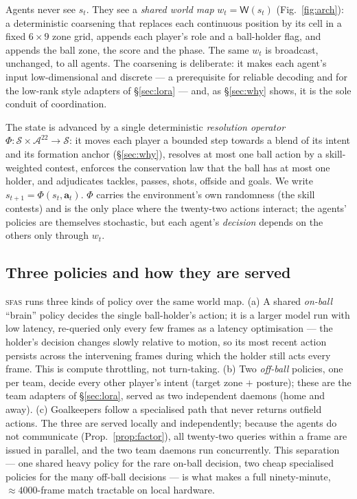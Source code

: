 \documentclass[11pt]{article}
\theoremstyle{definition}
\theoremstyle{remark}
\newcommand{\Sphere}{\mathcal{S}}
\newcommand{\Aspace}{\mathcal{A}}
\newcommand{\Wmap}{\mathsf{W}}
\newcommand{\sfas}{\textsc{sfas}}
\begin{document}
Agents never see $s_t$. They see a \emph{shared world map} $w_t=\Wmap(s_t)$ (Fig.~\ref{fig:arch}): a deterministic coarsening that replaces each continuous position by its cell in a fixed $6\times9$ zone grid, appends each player's role and a ball-holder flag, and appends the ball zone, the score and the phase. The same $w_t$ is broadcast, unchanged, to all agents. The coarsening is deliberate: it makes each agent's input low-dimensional and discrete --- a prerequisite for reliable decoding and for the low-rank style adapters of \S\ref{sec:lora} --- and, as \S\ref{sec:why} shows, it is the sole conduit of coordination.

The state is advanced by a single deterministic \emph{resolution operator} $\Phi:\Sphere\times\Aspace^{22}\to\Sphere$: it moves each player a bounded step towards a blend of its intent and its formation anchor (\S\ref{sec:why}), resolves at most one ball action by a skill-weighted contest, enforces the conservation law that the ball has at most one holder, and adjudicates tackles, passes, shots, offside and goals. We write $s_{t+1}=\Phi(s_t,\mathbf a_t)$. $\Phi$ carries the environment's own randomness (the skill contests) and is the only place where the twenty-two actions interact; the agents' policies are themselves stochastic, but each agent's \emph{decision} depends on the others only through $w_t$.

\subsection{Three policies and how they are served}\label{sec:serve}

\sfas{} runs three kinds of policy over the same world map. (a) A shared \emph{on-ball} ``brain'' policy decides the single ball-holder's action; it is a larger model run with low latency, re-queried only every few frames as a latency optimisation --- the holder's decision changes slowly relative to motion, so its most recent action persists across the intervening frames during which the holder still acts every frame. This is compute throttling, not turn-taking. (b) Two \emph{off-ball} policies, one per team, decide every other player's intent (target zone $+$ posture); these are the team adapters of \S\ref{sec:lora}, served as two independent daemons (home and away). (c) Goalkeepers follow a specialised path that never returns outfield actions. The three are served locally and independently; because the agents do not communicate (Prop.~\ref{prop:factor}), all twenty-two queries within a frame are issued in parallel, and the two team daemons run concurrently. This separation --- one shared heavy policy for the rare on-ball decision, two cheap specialised policies for the many off-ball decisions --- is what makes a full ninety-minute, $\approx4000$-frame match tractable on local hardware.
\end{document}
